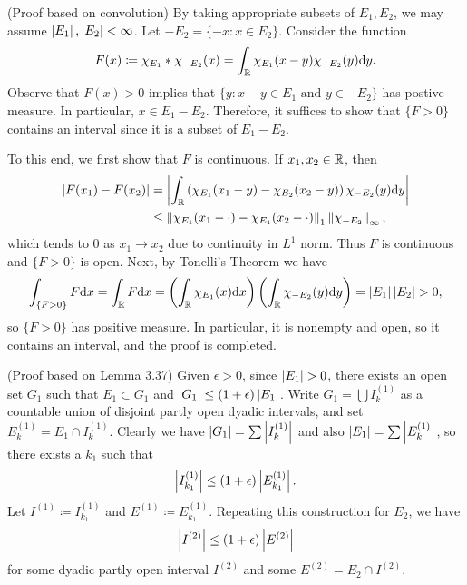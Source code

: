  
\begin{exercise}{7.4}
(Proof based on convolution)
  By taking appropriate subsets of $E_1, E_2$,
  we may assume $\left\vert E_1\right\vert, \left\vert E_2\right\vert < \infty$.
  Let $-E_2 = \{-x : x \in E_2\}$.
  Consider the function
  \[
    F(x) \coloneqq \chi_{E_1} * \chi_{-E_2} (x)
    = \int_{\mathbb{R}} \chi_{E_1}(x-y) \chi_{-E_2}(y) \mathrm{d} y.
  \]
  Observe that $F(x) > 0$ implies that
  $\{y : x-y \in E_1 \text{ and } y \in -E_2\}$ has postive measure.
  In particular, $x \in E_1 - E_2$.
  Therefore, it suffices to show that $\{F>0\}$ contains an interval
  since it is a subset of $E_1 - E_2$.

  To this end, we first show that $F$ is continuous.
  If $x_1, x_2 \in \mathbb{R}$, then
  \[
    \begin{aligned}
      \left| F(x_1) - F(x_2) \right|
      &= \left| \int_{\mathbb{R}} \left(\chi_{E_1}(x_1-y) - \chi_{E_2}(x_2-y)\right)
      \chi_{-E_2}(y) \mathrm{d} y
      \right| \\
      &\le \left\| \chi_{E_1}(x_1 - \cdot) - \chi_{E_1}(x_2 - \cdot) \right\|_1
      \left\| \chi_{-E_2} \right\|_{\infty},
    \end{aligned}
  \]
  which tends to $0$ as $x_1 \rightarrow x_2$ due to
  continuity in $L^1$ norm.
  Thus $F$ is continuous and $\{F>0\}$ is open.
  Next, by Tonelli's Theorem we have
  \[
    \int_{\{F>0\}} F \mathrm{d} x = \int_{\mathbb{R}} F \mathrm{d} x
    = \left(\int_{\mathbb{R}} \chi_{E_1}(x) \mathrm{d} x\right)
    \left(\int_{\mathbb{R}} \chi_{-E_2}(y) \mathrm{d} y\right)
    = \left|E_1\right| \left|E_2\right| > 0,
  \]
  so $\{F>0\}$ has positive measure.
  In particular, it is nonempty and open,
  so it contains an interval,
  and the proof is completed.

(Proof based on Lemma 3.37)
  Given $\epsilon > 0$, since $\left\vert E_1\right\vert > 0$,
  there exists an open set $G_1$ such that
  $E_1 \subset G_1$ and $\left\vert G_1\right\vert \le (1 + \epsilon) \left\vert E_1\right\vert$.
  Write $G_1 = \bigcup I^{(1)}_k$ as a countable union of
  disjoint partly open dyadic intervals,
  and set $E^{(1)}_k = E_1 \cap I^{(1)}_k$.
  Clearly we have
  $\left\vert G_1\right\vert = \sum \left\vert I^{(1)}_k\right\vert$ and
  also $\left\vert E_1\right\vert = \sum \left\vert E^{(1)}_k\right\vert$,
  so there exists a $k_1$ such that
  \begin{equation}
    \left\vert I^{(1)}_{k_1}\right\vert \le (1 + \epsilon) \left\vert E^{(1)}_{k_1}\right\vert.
    \label{eq:measureEstimateForE1}
  \end{equation}
  Let $I^{(1)} \coloneqq I^{(1)}_{k_1}$ and $E^{(1)} \coloneqq E^{(1)}_{k_1}$.
  Repeating this construction for $E_2$, we have
  \[
    \left\vert I^{(2)}\right\vert \le (1 + \epsilon) \left\vert E^{(2)}\right\vert
  \]
  for some dyadic partly open interval $I^{(2)}$
  and some $E^{(2)} = E_2 \cap I^{(2)}$.


\end{exercise}
